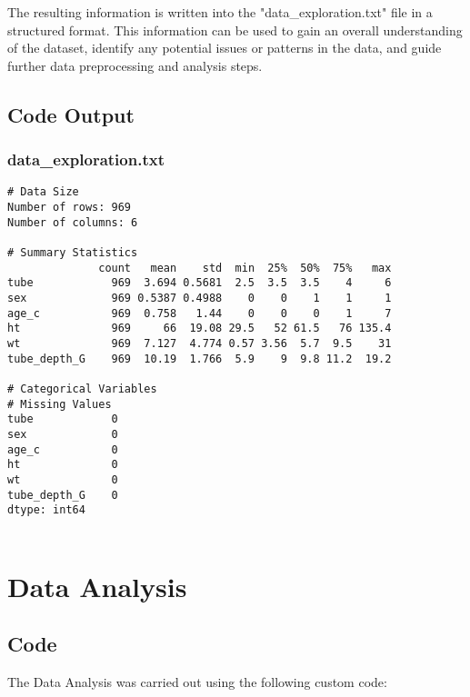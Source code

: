 \documentclass[11pt]{article}
\begin{document}
The resulting information is written into the "data\_exploration.txt" file in a structured format. This information can be used to gain an overall understanding of the dataset, identify any potential issues or patterns in the data, and guide further data preprocessing and analysis steps.

\subsection{Code Output}

\subsubsection*{data\_exploration.txt}

\begin{Verbatim}[tabsize=4]
# Data Size
Number of rows: 969
Number of columns: 6

# Summary Statistics
              count   mean    std  min  25%  50%  75%   max
tube            969  3.694 0.5681  2.5  3.5  3.5    4     6
sex             969 0.5387 0.4988    0    0    1    1     1
age_c           969  0.758   1.44    0    0    0    1     7
ht              969     66  19.08 29.5   52 61.5   76 135.4
wt              969  7.127  4.774 0.57 3.56  5.7  9.5    31
tube_depth_G    969  10.19  1.766  5.9    9  9.8 11.2  19.2

# Categorical Variables
# Missing Values
tube            0
sex             0
age_c           0
ht              0
wt              0
tube_depth_G    0
dtype: int64


\end{Verbatim}

\section{Data Analysis}
\subsection{{Code}}
The Data Analysis was carried out using the following custom code:
\end{document}
